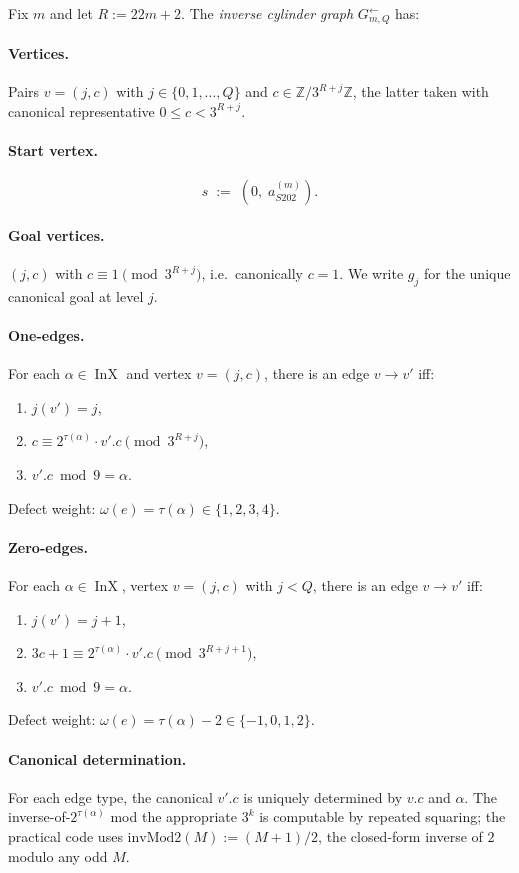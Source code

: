 \documentclass[11pt,a4paper]{article}
\theoremstyle{plain}
\theoremstyle{definition}
\newcommand{\ZZ}{\mathbb{Z}}
\newcommand{\aSat}{a_{S202}^{(m)}}
\newcommand{\InvG}{G^{\!\leftarrow}}
\DeclareMathOperator{\InX}{InX}
\begin{document}
Fix $m$ and let $R := 22m + 2$. The \emph{inverse cylinder graph}
$\InvG_{m, Q}$ has:

\paragraph{Vertices.}
Pairs $v = (j, c)$ with
$j \in \{0, 1, \dots, Q\}$ and
$c \in \ZZ/3^{R+j}\ZZ$, the latter taken with canonical
representative $0 \le c < 3^{R+j}$.

\paragraph{Start vertex.}
\[
   s \;:=\; (0,\; \aSat).
\]

\paragraph{Goal vertices.}
$(j, c)$ with $c \equiv 1 \pmod{3^{R+j}}$, i.e.\ canonically
$c = 1$. We write $g_j$ for the unique canonical goal at level $j$.

\paragraph{One-edges.}
For each $\alpha \in \InX$ and vertex $v = (j, c)$, there is an edge
$v \to v'$ iff:
\begin{enumerate}
  \item $j(v') = j$,
  \item $c \equiv 2^{\tau(\alpha)} \cdot v'.c \pmod{3^{R+j}}$,
  \item $v'.c \bmod 9 = \alpha$.
\end{enumerate}
Defect weight: $\omega(e) = \tau(\alpha) \in \{1, 2, 3, 4\}$.

\paragraph{Zero-edges.}
For each $\alpha \in \InX$, vertex $v = (j, c)$ with $j < Q$, there
is an edge $v \to v'$ iff:
\begin{enumerate}
  \item $j(v') = j + 1$,
  \item $3 c + 1 \equiv 2^{\tau(\alpha)} \cdot v'.c \pmod{3^{R + j + 1}}$,
  \item $v'.c \bmod 9 = \alpha$.
\end{enumerate}
Defect weight: $\omega(e) = \tau(\alpha) - 2 \in \{-1, 0, 1, 2\}$.

\paragraph{Canonical determination.}
For each edge type, the canonical $v'.c$ is uniquely determined by
$v.c$ and $\alpha$. The inverse-of-$2^{\tau(\alpha)}$ mod the
appropriate $3^k$ is computable by repeated squaring; the
practical code uses
\(\mathrm{invMod2}(M) := (M+1)/2\),
the closed-form inverse of $2$ modulo any odd $M$.
\end{document}
